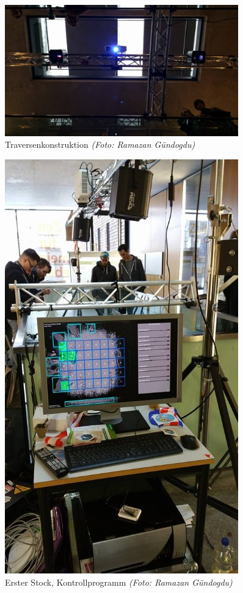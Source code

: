 \begin{figure}[htbp]
	\centering
		\includegraphics[width=0.9\textwidth]{images/TdM3.jpg}
	\caption{Traversenkonstruktion \textit{(Foto: Ramazan Gündogdu)}}
	\label{fig:TdM3}
\end{figure}

\begin{figure}[htbp]
	\centering
		\includegraphics[width=0.9\textwidth]{images/TdM4.jpg}
	\caption{Erster Stock, Kontrollprogramm \textit{(Foto: Ramazan Gündogdu)}}
	\label{fig:TdM4}
\end{figure}

